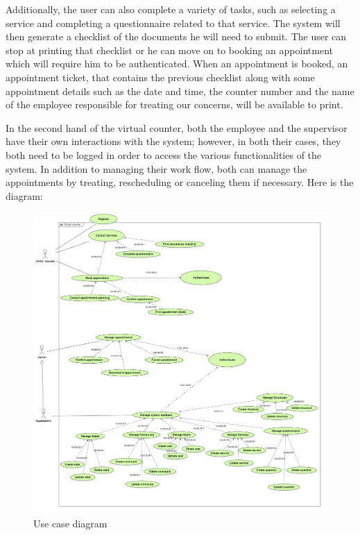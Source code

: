  Additionally, the user can also complete a variety of tasks, such as selecting a service and completing a questionnaire related to that service. The system will then generate a checklist of the documents he will need to submit. The user can stop at printing that checklist or he can move on to booking an appointment which will require him to be authenticated. When an appointment is booked, an appointment ticket, that contains the previous checklist along with some appointment details such as the date and time, the counter number and the name of the employee responsible for treating our concerns,  will be available to print. 
 
 \medskip In the second hand of the virtual counter, both the employee and the supervisor have their own interactions with the system; however, in both their cases, they both need to be logged in order to access the various functionalities of the system. In addition to managing their work flow, both can manage the appointments by treating, rescheduling or canceling them if necessary. 
\newpage
 \medskip Here is the diagram:

 \begin{figure}[H]
    \centering
    \includegraphics[width=1.0\textwidth]{usecase.PNG}
    \caption{Use case diagram}

    \label{ucdiagram}
 \end{figure}
 \newpage
